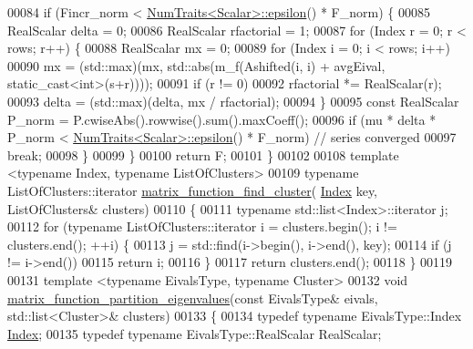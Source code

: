 \begin{DoxyCode}
00084     \textcolor{keywordflow}{if} (Fincr\_norm < \hyperlink{group___core___module_struct_eigen_1_1_num_traits}{NumTraits<Scalar>::epsilon}() * F\_norm) \{
00085       RealScalar delta = 0;
00086       RealScalar rfactorial = 1;
00087       \textcolor{keywordflow}{for} (Index r = 0; r < rows; r++) \{
00088         RealScalar mx = 0;
00089         \textcolor{keywordflow}{for} (Index i = 0; i < rows; i++)
00090           mx = (std::max)(mx, std::abs(m\_f(Ashifted(i, i) + avgEival, static\_cast<int>(s+r))));
00091         \textcolor{keywordflow}{if} (r != 0)
00092           rfactorial *= RealScalar(r);
00093         delta = (std::max)(delta, mx / rfactorial);
00094       \}
00095       \textcolor{keyword}{const} RealScalar P\_norm = P.cwiseAbs().rowwise().sum().maxCoeff();
00096       \textcolor{keywordflow}{if} (mu * delta * P\_norm < \hyperlink{group___core___module_struct_eigen_1_1_num_traits}{NumTraits<Scalar>::epsilon}() * F\_norm) \textcolor{comment}{// series
       converged}
00097         \textcolor{keywordflow}{break};
00098     \}
00099   \}
00100   \textcolor{keywordflow}{return} F;
00101 \}
00102 
00108 \textcolor{keyword}{template} <\textcolor{keyword}{typename} Index, \textcolor{keyword}{typename} ListOfClusters>
00109 \textcolor{keyword}{typename} ListOfClusters::iterator \hyperlink{namespace_eigen_1_1internal_af9cdbae9f4f166fae876c54b97c0f2bb}{matrix\_function\_find\_cluster}(
      \hyperlink{namespace_eigen_a62e77e0933482dafde8fe197d9a2cfde}{Index} key, ListOfClusters& clusters)
00110 \{
00111   \textcolor{keyword}{typename} std::list<Index>::iterator j;
00112   \textcolor{keywordflow}{for} (\textcolor{keyword}{typename} ListOfClusters::iterator i = clusters.begin(); i != clusters.end(); ++i) \{
00113     j = std::find(i->begin(), i->end(), key);
00114     \textcolor{keywordflow}{if} (j != i->end())
00115       \textcolor{keywordflow}{return} i;
00116   \}
00117   \textcolor{keywordflow}{return} clusters.end();
00118 \}
00119 
00131 \textcolor{keyword}{template} <\textcolor{keyword}{typename} EivalsType, \textcolor{keyword}{typename} Cluster>
00132 \textcolor{keywordtype}{void} \hyperlink{namespace_eigen_1_1internal_a9291a6ab4fe0ad1346049a8f2feddeaa}{matrix\_function\_partition\_eigenvalues}(\textcolor{keyword}{const} EivalsType& eivals, 
      std::list<Cluster>& clusters)
00133 \{
00134   \textcolor{keyword}{typedef} \textcolor{keyword}{typename} EivalsType::Index \hyperlink{namespace_eigen_a62e77e0933482dafde8fe197d9a2cfde}{Index};
00135   \textcolor{keyword}{typedef} \textcolor{keyword}{typename} EivalsType::RealScalar RealScalar;

\end{DoxyCode}
